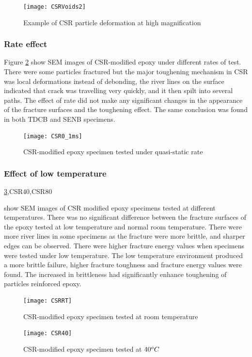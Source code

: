 \documentclass[numbers=noendperiod,chapterprefix=on]{icldt} %
\begin{document}
{\begin{figure}[!htpb]
\centering
\texttt{[image: CSRVoids2]}
\caption{Example of CSR particle deformation at high magnification }\label{CSRVoids2}
\end{figure}
\FloatBarrier

\subsubsection{Rate effect} 
Figure \ref{CSR0_1ms} show SEM images of CSR-modified epoxy under different rates of test. There were some particles fractured but the major toughening mechanism in CSR was local deformations instead of debonding, the river lines on the surface indicated that crack was travelling very quickly, and it then spilt into several paths. The effect of rate did not make any significant changes in the appearance of the fracture surfaces and the toughening effect. The same conclusion was found in both TDCB and SENB specimens.


\begin{figure}[!htpb]
\centering
\texttt{[image: CSR0\_1ms]} 
\caption{CSR-modified epoxy specimen tested under quasi-static rate } \label{CSR0_1ms}
\end{figure}
\FloatBarrier


\subsubsection{Effect of low temperature}
\ref{CSRRT},CSR40,CSR80} show SEM images of CSR modified epoxy specimens tested at different temperatures. There was no significant difference between the fracture surfaces of the epoxy tested at low temperature and normal room temperature. There were more river lines in some specimens as the fracture were more brittle, and sharper edges can be observed. There were higher fracture energy values when specimens were tested under low temperature. The low temperature environment produced a more brittle failure, higher fracture toughness and fracture energy values were found. The increased in brittleness had significantly enhance toughening of particles reinforced epoxy. 

\begin{figure}[!htpb]
\centering
\texttt{[image: CSRRT]}
\caption{CSR-modified epoxy specimen tested at room temperature }\label{CSRRT}
\end{figure}
\FloatBarrier

\begin{figure}[!htpb]
\centering
\texttt{[image: CSR40]} 
\caption{CSR-modified epoxy specimen tested at $\-40 ^oC$}\label{CSR40}
\end{figure}
\FloatBarrier
\end{document}
